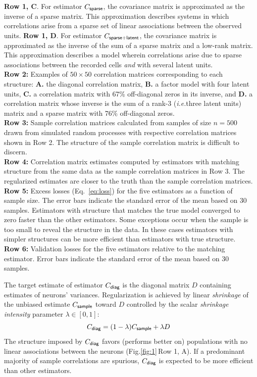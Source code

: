 \documentclass[10pt]{article}
\newcommand{\figref}[2]{Fig.\;\ref{fig:#1}\,#2}
\newcommand{\ie}{\emph{i.e.}\;}
\begin{document}
\begin{FPfigure}
{        {\bf  Row 1, C}. For estimator $C_{\sf sparse}$, the covariance matrix is approximated as the inverse of a sparse matrix. This approximation describes systems in which correlations arise from a sparse set of  linear associations between the observed units. 
        {\bf  Row 1, D}.  For estimator $C_{\sf sparse+latent}$, the covariance matrix is approximated as the inverse of the sum of a sparse matrix and a low-rank matrix. This approximation describes a model wherein correlations arise due to sparse associations between the recorded cells \emph{and} with several latent units. \\
{\bf Row 2:} Examples of $50\times 50$ correlation matrices corresponding to each structure: {\bf A.} the diagonal correlation matrix, {\bf B.} a factor model with four latent units, {\bf C.}  a correlation matrix with 67\%  off-diagonal zeros in its inverse, and {\bf  D.} a correlation matrix whose inverse is the sum of a rank-3 (\ie three latent units) matrix and a sparse matrix with 76\% off-diagonal zeros. 
\\
{\bf Row 3:} Sample correlation matrices calculated from samples of size $n=500$ drawn from simulated random processes with respective correlation matrices shown in Row 2.  The structure of the sample correlation matrix is difficult to discern.
\\
{\bf Row 4:} Correlation matrix estimates computed by estimators with matching structure from the same data as the sample correlation matrices in Row 3. The regularized estimates are closer to the truth than the sample correlation matrices.
\\
{\bf Row 5:} Excess losses (Eq.~\ref{eq:loss}) for the five estimators as a function of sample size. The error bars indicate the standard error of the mean based on 30 samples.  Estimators with structure that matches the true model converged to zero faster than the other estimators. Some exceptions occur when the sample is too small to reveal the structure in the data. In these cases estimators with simpler structures can be more efficient than estimators with true structure.
\\
{\bf Row 6:} Validation losses for the five estimators relative to the matching estimator. Error bars indicate the standard error of the mean based on 30 samples.
    }
    \label{fig:1}
\end{FPfigure} 

The target estimate of estimator $C_{\sf diag}$ is the diagonal matrix $D$ containing estimates of neurons' variances. Regularization is achieved by linear \emph{shrinkage} of the unbiased estimate $C_{\sf sample}$ toward $D$ controlled by the scalar \emph{shrinkage intensity} parameter $\lambda \in [0, 1]$:
\begin{equation}\label{eq:c-diag}
C_{\sf diag} = (1-\lambda) C_{\sf sample} + \lambda D
\end{equation}
The structure imposed by $C_{\sf diag}$ favors (performs better  on) populations   with no linear associations between the neurons (\figref{1}{Row 1, A}).  If a predominant majority of sample correlations are spurious, $C_{\sf diag}$ is expected to be more efficient than other estimators. 
\end{document}

